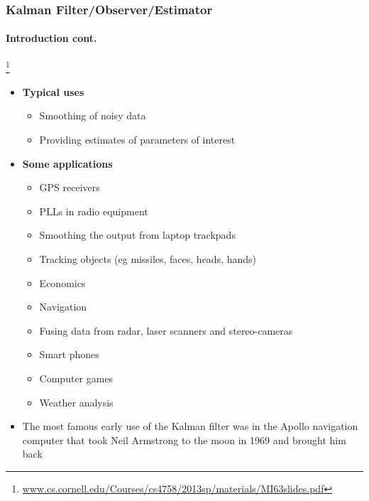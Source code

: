 \begin{frame}
\frametitle{Kalman Filter/Observer/Estimator}
\framesubtitle{Introduction \tiny cont.}

\footnote{\tiny\hspace{-0.23in} \href{www.cs.cornell.edu/Courses/cs4758/2013sp/materials/MI63slides.pdf‎}{www.cs.cornell.edu/Courses/cs4758/2013sp/materials/MI63slides.pdf‎}}
\begin{itemize}\scriptsize
\item \textbf{Typical uses}
\begin{itemize}\scriptsize
\item Smoothing of noisy data 
\item Providing estimates of parameters of interest
\end{itemize}
\item \textbf{Some applications}
\begin{itemize}\scriptsize
\item GPS receivers
\item PLLs in radio equipment
\item Smoothing the output from laptop trackpads
\item Tracking objects (eg missiles, faces, heads, hands)
\item Economics
\item Navigation
\item Fusing data from radar, laser scanners and stereo-cameras
\item Smart phones
\item Computer games
\item Weather analysis
\end{itemize}
\item The most famous early use of the Kalman filter was in the Apollo navigation computer that took Neil Armstrong to the moon in 1969 and brought him back
\end{itemize}
\end{frame}



